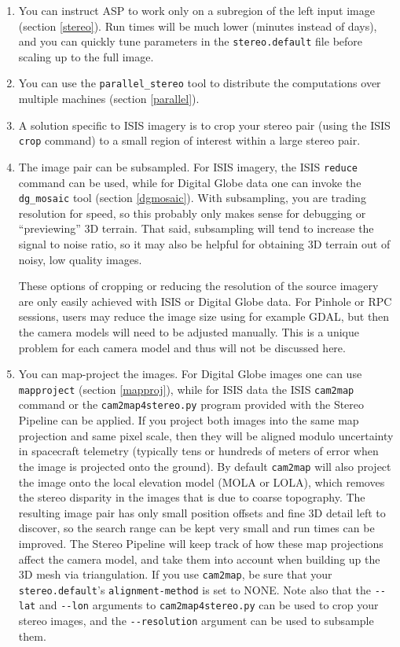 \begin{enumerate}

\item You can instruct ASP to work only on a subregion of the left input
image (section \ref{stereo}). Run times will be much lower (minutes
instead of days), and you can quickly tune parameters in the
\texttt{stereo.default} file before scaling up to the full image.

\item You can use the \texttt{parallel\_stereo} tool to distribute the
  computations over multiple machines (section \ref{parallel}).

\item A solution specific to ISIS imagery is to crop your stereo pair
(using the ISIS \texttt{crop} command) to a small region of interest
within a large stereo pair.

\item The image pair can be subsampled. For ISIS imagery, the ISIS
\texttt{reduce} command can be used, while for Digital Globe data one
can invoke the \texttt{dg\_mosaic} tool (section \ref{dgmosaic}). With
subsampling, you are trading resolution for speed, so this probably only
makes sense for debugging or ``previewing'' 3D terrain. That said,
subsampling will tend to increase the signal to noise ratio, so it may
also be helpful for obtaining 3D terrain out of noisy, low quality images.

These options of cropping or reducing the resolution of the source
imagery are only easily achieved with ISIS or Digital Globe data. For
Pinhole or RPC sessions, users may reduce the image size using for
example GDAL, but then the camera models will need to be adjusted
manually. This is a unique problem for each camera model and thus will
not be discussed here.

\item You can map-project the images. For Digital Globe images one can
  use \texttt{mapproject} (section \ref{mapproj}), while for ISIS
  data the ISIS \texttt{cam2map} command or the \texttt{cam2map4stereo.py} program
provided with the Stereo Pipeline can be applied. If you project both images into the
same map projection and same pixel scale, then they will be aligned
modulo uncertainty in spacecraft telemetry (typically tens or hundreds
of meters of error when the image is projected onto the ground).  By default
\texttt{cam2map} will also project the image onto the local elevation
model (MOLA or LOLA), which removes the stereo disparity in the images
that is due to coarse topography.  The resulting image pair has only
small position offsets and fine 3D detail left to discover, so the
search range can be kept very small and run times can be improved.
The Stereo Pipeline will keep track of how these map
projections affect the camera model, and take them into account when
building up the 3D mesh via triangulation.  If you use \texttt{cam2map},
be sure that your \texttt{stereo.default}'s \texttt{alignment-method} is
set to NONE.  Note also that the \texttt{-\/-lat} and \texttt{-\/-lon}
arguments to \texttt{cam2map4stereo.py} can be used to crop your stereo
images, and the \texttt{-\/-resolution} argument can be used to
subsample them.
\end{enumerate}

